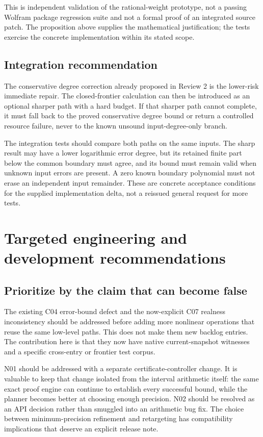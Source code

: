\documentclass[11pt,letterpaper]{article}
\begin{document}
This is independent validation of the rational-weight prototype, not a passing Wolfram package regression suite and not a formal proof of an integrated source patch. The proposition above supplies the mathematical justification; the tests exercise the concrete implementation within its stated scope.

\subsection{Integration recommendation}
The conservative degree correction already proposed in Review 2 is the lower-risk immediate repair. The closed-frontier calculation can then be introduced as an optional sharper path with a hard budget. If that sharper path cannot complete, it must fall back to the proved conservative degree bound or return a controlled resource failure, never to the known unsound input-degree-only branch.

The integration tests should compare both paths on the same inputs. The sharp result may have a lower logarithmic error degree, but its retained finite part below the common boundary must agree, and its bound must remain valid when unknown input errors are present. A zero known boundary polynomial must not erase an independent input remainder. These are concrete acceptance conditions for the supplied implementation delta, not a reissued general request for more tests.

\section{Targeted engineering and development recommendations}
\label{sec:development}
\subsection{Prioritize by the claim that can become false}
The existing C04 error-bound defect and the now-explicit C07 realness inconsistency should be addressed before adding more nonlinear operations that reuse the same low-level paths. This does not make them new backlog entries. The contribution here is that they now have native current-snapshot witnesses and a specific cross-entry or frontier test corpus.

N01 should be addressed with a separate certificate-controller change. It is valuable to keep that change isolated from the interval arithmetic itself: the same exact proof engine can continue to establish every successful bound, while the planner becomes better at choosing enough precision. N02 should be resolved as an API decision rather than smuggled into an arithmetic bug fix. The choice between minimum-precision refinement and retargeting has compatibility implications that deserve an explicit release note.
\end{document}
